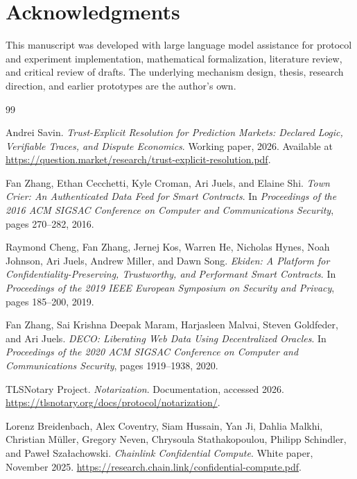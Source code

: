 \documentclass[10pt]{article}
\begin{document}
\section*{Acknowledgments}
This manuscript was developed with large language model assistance for protocol and experiment implementation, mathematical formalization, literature review, and critical review of drafts. The underlying mechanism design, thesis, research direction, and earlier prototypes are the author's own.
\begin{thebibliography}{99}

Andrei Savin.
\newblock \emph{Trust-Explicit Resolution for Prediction Markets: Declared Logic, Verifiable Traces, and Dispute Economics}.
\newblock Working paper, 2026.
\newblock Available at \url{https://question.market/research/trust-explicit-resolution.pdf}.

Fan Zhang, Ethan Cecchetti, Kyle Croman, Ari Juels, and Elaine Shi.
\newblock \emph{Town Crier: An Authenticated Data Feed for Smart Contracts}.
\newblock In \emph{Proceedings of the 2016 ACM SIGSAC Conference on Computer and Communications Security}, pages 270--282, 2016.

Raymond Cheng, Fan Zhang, Jernej Kos, Warren He, Nicholas Hynes, Noah Johnson, Ari Juels, Andrew Miller, and Dawn Song.
\newblock \emph{Ekiden: A Platform for Confidentiality-Preserving, Trustworthy, and Performant Smart Contracts}.
\newblock In \emph{Proceedings of the 2019 IEEE European Symposium on Security and Privacy}, pages 185--200, 2019.

Fan Zhang, Sai Krishna Deepak Maram, Harjasleen Malvai, Steven Goldfeder, and Ari Juels.
\newblock \emph{DECO: Liberating Web Data Using Decentralized Oracles}.
\newblock In \emph{Proceedings of the 2020 ACM SIGSAC Conference on Computer and Communications Security}, pages 1919--1938, 2020.

TLSNotary Project.
\newblock \emph{Notarization}.
\newblock Documentation, accessed 2026.
\newblock \url{https://tlsnotary.org/docs/protocol/notarization/}.

Lorenz Breidenbach, Alex Coventry, Siam Hussain, Yan Ji, Dahlia Malkhi, Christian M\"{u}ller, Gregory Neven, Chrysoula Stathakopoulou, Philipp Schindler, and Pawe{\l} Sza{\l}achowski.
\newblock \emph{Chainlink Confidential Compute}.
\newblock White paper, November 2025.
\newblock \url{https://research.chain.link/confidential-compute.pdf}.


\end{thebibliography}
\end{document}
